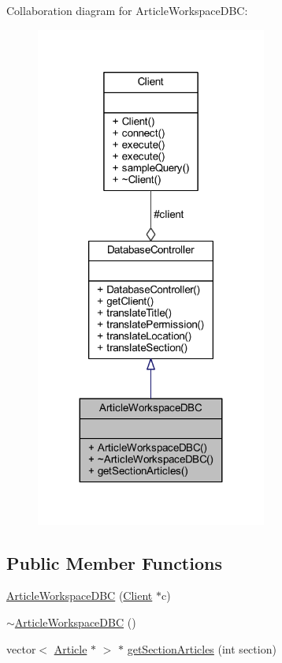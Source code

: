 Collaboration diagram for Article\+Workspace\+D\+B\+C\+:
\nopagebreak
\begin{figure}[H]
\begin{center}
\leavevmode
\includegraphics[width=215pt]{class_article_workspace_d_b_c__coll__graph}
\end{center}
\end{figure}
\subsection*{Public Member Functions}
\begin{DoxyCompactItemize}
\item 
\hyperlink{class_article_workspace_d_b_c_a6ba8051cacacd5891617c2660445e785}{Article\+Workspace\+D\+B\+C} (\hyperlink{class_client}{Client} $\ast$c)
\item 
\hyperlink{class_article_workspace_d_b_c_a33fe6c8c9fe73aecbbaf89f2f3b774ae}{$\sim$\+Article\+Workspace\+D\+B\+C} ()
\item 
vector$<$ \hyperlink{class_article}{Article} $\ast$ $>$ $\ast$ \hyperlink{class_article_workspace_d_b_c_a93dd1083751db176acb145bdc48d7b3d}{get\+Section\+Articles} (int section)
\end{DoxyCompactItemize}
